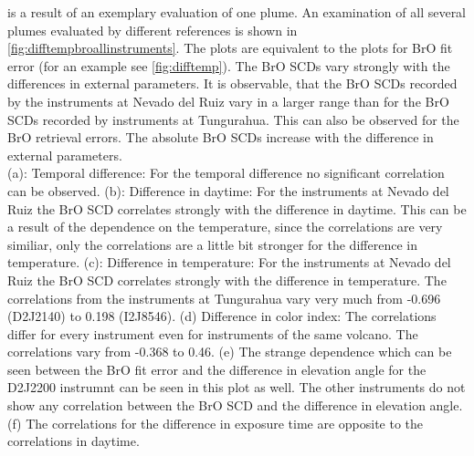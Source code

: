 \documentclass  [
  paper    = a4,
  BCOR     = 10mm,
  twoside,
  fontsize = 12pt,
  fleqn,
  toc      = bibnumbered,
  toc      = listofnumbered,
  numbers  = noendperiod,
  headings = normal,
  listof   = leveldown,
  version  = 3.03
]                                       {scrreprt}
\begin{document}
	 is a result of an exemplary evaluation of one plume. An examination of all several plumes evaluated by different references is shown in \cref{fig:difftempbroallinstruments}. The plots are equivalent to the plots for BrO fit error (for an example see \cref{fig:difftemp}). The BrO SCDs vary strongly with the differences in external parameters. It is observable, that the BrO SCDs recorded by the instruments at Nevado del Ruiz vary in a larger range than for the BrO SCDs recorded by instruments at Tungurahua. This can also be observed for the BrO retrieval errors. The absolute BrO SCDs increase with the difference in external parameters.\\
	  (a): Temporal difference: For the temporal difference no significant correlation can be observed.
	 (b): Difference in daytime: For the instruments at Nevado del Ruiz the BrO SCD correlates strongly with the difference in daytime. This can be a result of the dependence on the temperature, since the correlations are very similiar, only the correlations are a little bit stronger for the difference in temperature.
	 (c): Difference in temperature: For the instruments at Nevado del Ruiz the BrO SCD correlates strongly with the difference in temperature. The correlations from the instruments at Tungurahua vary very much from -0.696 (D2J2140) to 0.198 (I2J8546).
	  (d) Difference in color index: The correlations differ for every instrument even for instruments of the same volcano. The correlations vary from -0.368 to 0.46.
	  (e) The strange dependence which can be seen between the BrO fit error and the difference in elevation angle for the D2J2200 instrumnt can be seen in this plot as well. The other instruments do not show any correlation between the BrO SCD and the difference in elevation angle.
	  (f) The correlations for the difference in exposure time are opposite to the correlations in daytime. 
\end{document}
